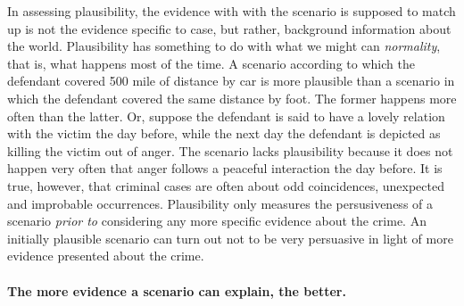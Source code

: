 \documentclass[10pt]{article}
\begin{document}
In assessing plausibility, the evidence with with the scenario is supposed to match 
 up is not the evidence specific to case, but rather, background information about the world. 
Plausibility has something to do with what we might can \textit{normality}, that is, 
what happens most of the time. A scenario according to which the defendant covered 500 mile of distance by car is more plausible than a scenario in which the
defendant covered the same distance by foot. The former happens more often than the latter. 
Or, suppose the defendant is said to have a lovely relation with 
the victim the day before, while the next day the defendant is depicted as killing the victim out of anger.
The scenario lacks plausibility because it does not happen very often that anger follows a peaceful 
interaction the day before. It is true, however, that criminal cases are often about odd coincidences, 
unexpected and improbable occurrences.  Plausibility only measures the persusiveness of a scenario 
\textit{prior to} considering any more specific evidence about the crime.  An initially plausible scenario can 
turn out not to be 
very persuasive in light of more evidence presented about the crime. 



 
 


\paragraph{The more evidence a scenario can explain, the better.}
\end{document}
